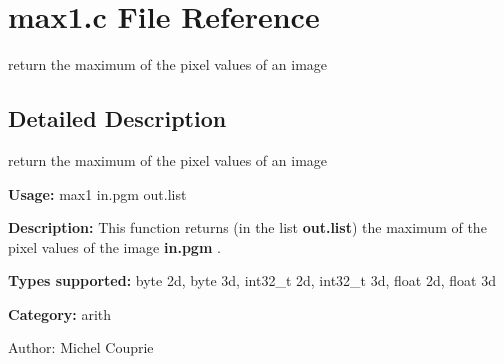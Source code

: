 \section{max1.c File Reference}
\label{max1_8c}
return the maximum of the pixel values of an image 



\subsection{Detailed Description}
return the maximum of the pixel values of an image 

{\bf Usage:} max1 in.pgm out.list

{\bf Description:} This function returns (in the list {\bf out.list}) the maximum of the pixel values of the image {\bf in.pgm} .

{\bf Types supported:} byte 2d, byte 3d, int32\_\-t 2d, int32\_\-t 3d, float 2d, float 3d

{\bf Category:} arith

\begin{Desc}
\item[Author:]Michel Couprie \end{Desc}
